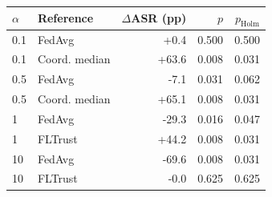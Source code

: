 \begin{tabular}{@{}llrrr@{}}
\toprule
$\alpha$ & Reference & $\Delta$ASR (pp) & $p$ & $p_{\text{Holm}}$\\
\midrule
0.1 & FedAvg & +0.4 & 0.500 & 0.500\\
0.1 & Coord. median & +63.6 & 0.008 & 0.031\\
0.5 & FedAvg & -7.1 & 0.031 & 0.062\\
0.5 & Coord. median & +65.1 & 0.008 & 0.031\\
1 & FedAvg & -29.3 & 0.016 & 0.047\\
1 & FLTrust & +44.2 & 0.008 & 0.031\\
10 & FedAvg & -69.6 & 0.008 & 0.031\\
10 & FLTrust & -0.0 & 0.625 & 0.625\\
\bottomrule
\end{tabular}
